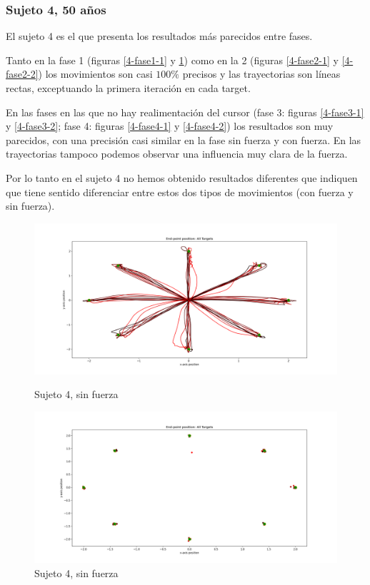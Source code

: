 \documentclass[a4paper,11pt, oneside]{book}
\begin{document}
\subsubsection{Sujeto 4, 50 años}

El sujeto 4 es el que presenta los resultados más parecidos entre fases. 

Tanto en la fase 1 (figuras \ref{4-fase1-1} y \ref{4-fase1-2}) como en la 2 (figuras \ref{4-fase2-1} y \ref{4-fase2-2}) los movimientos son casi $100\%$ precisos y las trayectorias son líneas rectas, exceptuando la primera iteración en cada target.

En las fases en las que no hay realimentación del cursor (fase 3: figuras \ref{4-fase3-1} y \ref{4-fase3-2}; fase 4: figuras \ref{4-fase4-1} y \ref{4-fase4-2}) los resultados son muy parecidos, con una precisión casi similar en la fase sin fuerza y con fuerza. En las trayectorias tampoco podemos observar una influencia muy clara de la fuerza.

Por lo tanto en el sujeto 4 no hemos obtenido resultados diferentes que indiquen que tiene sentido diferenciar entre estos dos tipos de movimientos (con fuerza y sin fuerza).

\begin{figure}[H]
	\begin{minipage}[b]{0.5\linewidth}
		\centering
		\includegraphics[width=\linewidth]{sujeto4/no_force/trayectorias}
		\caption{Sujeto 4, sin fuerza}
		\label{4-fase1-1}
	\end{minipage}
	\hspace{0.5cm}
	\begin{minipage}[b]{0.5\linewidth}
		\centering
		\includegraphics[width=\linewidth]{sujeto4/no_force/trayectorias_puntos}
		\caption{Sujeto 4, sin fuerza}
		\label{4-fase1-2}
	\end{minipage}
\end{figure}
\end{document}
